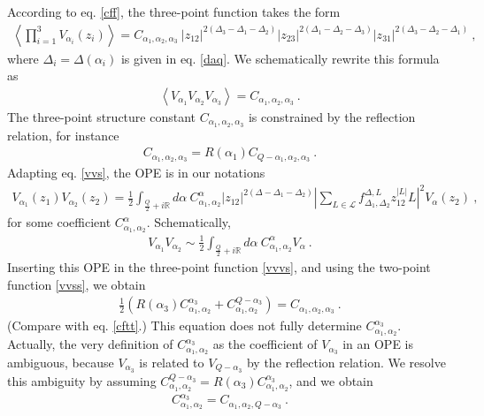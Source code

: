 \documentclass[12pt, a4paper, notitlepage, twoside]{report}
\numberwithin{equation}{section}
\theoremstyle{break}
\begin{document}
According to eq. \eqref{cff}, the three-point function takes the form
\begin{align}
\left\langle \prod_{i=1}^3 V_{\alpha_i}(z_i)\right\rangle = C_{\alpha_1,\alpha_2,\alpha_3}\ |z_{12}|^{2(\Delta_3-\Delta_1-\Delta_2)} |z_{23}|^{2(\Delta_1-\Delta_2-\Delta_3)} |z_{31}|^{2(\Delta_3-\Delta_2-\Delta_1)}\ ,
\label{vvv}
\end{align}
where $\Delta_i = \Delta(\alpha_i)$ is given in eq. \eqref{daq}.
We schematically rewrite this formula as 
\begin{align}
 \boxed{ \left\langle V_{\alpha_1}V_{\alpha_2}V_{\alpha_3} \right\rangle = C_{\alpha_1,\alpha_2,\alpha_3} }\ .
\label{vvvs}
\end{align}
The three-point structure constant $C_{\alpha_1,\alpha_2,\alpha_3}$ is constrained by the reflection relation, for instance
\begin{align}
 C_{\alpha_1,\alpha_2,\alpha_3} = R(\alpha_1) C_{Q-\alpha_1,\alpha_2,\alpha_3}\ .
\label{crc}
\end{align}
Adapting eq. \eqref{vvs}, the OPE is in our notations
\begin{multline}
 V_{\alpha_1}(z_1) V_{\alpha_2}(z_2) = \frac12 \int_{\frac{Q}{2}+i{\mathbb{R}}} d\alpha\ C_{\alpha_1,\alpha_2}^\alpha |z_{12}|^{2(\Delta-\Delta_1-\Delta_2)} 
\left|
\sum_{L\in \mathcal{L}} f_{\Delta_1,\Delta_2}^{\Delta,L} z_{12}^{|L|}  L\right|^2 V_{\alpha}(z_2) \ , 
\end{multline}
for some coefficient $C_{\alpha_1,\alpha_2}^\alpha$.
Schematically,
\begin{align}
 \boxed{V_{\alpha_1}V_{\alpha_2} \sim \frac12\int_{\frac{Q}{2}+i{\mathbb{R}}} d\alpha\ C_{\alpha_1,\alpha_2}^{\alpha} V_\alpha}\ .
\label{vvi}
\end{align}
Inserting this OPE in the three-point function \eqref{vvvs}, and using the two-point function \eqref{vvss}, we obtain
\begin{align}
 \frac12\left(R(\alpha_3)C_{\alpha_1,\alpha_2}^{\alpha_3} + C_{\alpha_1,\alpha_2}^{Q-\alpha_3}\right) = C_{\alpha_1,\alpha_2,\alpha_3}
\ . 
\label{hcc}
\end{align}
(Compare with eq. \eqref{cftt}.) 
This equation does not fully determine $C_{\alpha_1,\alpha_2}^{\alpha_3}$.
Actually, the very definition of $C_{\alpha_1,\alpha_2}^{\alpha_3}$ as the coefficient of $V_{\alpha_3}$ in an OPE is ambiguous, because $V_{\alpha_3}$ is related to $V_{Q-\alpha_3}$ by the reflection relation.
We  resolve this ambiguity by assuming $C_{\alpha_1,\alpha_2}^{Q-\alpha_3}=R(\alpha_3)C_{\alpha_1,\alpha_2}^{\alpha_3}$, and we obtain
\begin{align}
 \boxed{C_{\alpha_1,\alpha_2}^{\alpha_3} = C_{\alpha_1,\alpha_2,Q-\alpha_3}}\ .
\label{cec}
\end{align}
\end{document}
